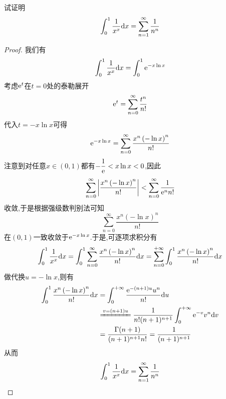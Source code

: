 \documentclass{ctexart}
\begin{document}
\begin{problem}[9.(5\songti{分})]
    试证明
    \[\int_0^1\dfrac{1}{x^x}\mathrm{d} x=\sum_{n=1}^{\infty}\dfrac{1}{n^n}\]
    
\end{problem}
\begin{proof}
    我们有
    \[\int_0^1\dfrac{1}{x^x}\mathrm{d} x=\int_0^1\mathrm{e}^{-x\ln x}\]
    考虑$\mathrm{e}^t$在$t=0$处的泰勒展开
    \[\mathrm{e}^t=\sum_{n=0}^{\infty}\dfrac{t^n}{n!}\]
    代入$t=-x\ln x$可得
    \[\mathrm{e}^{-x\ln x}=\sum_{n=0}^{\infty}\dfrac{x^n\left(-\ln x\right)^n}{n!}\]
    注意到对任意$x\in(0,1)$都有$-\dfrac1{\mathrm{e}}<x\ln x<0$,因此
    \[\sum_{n=0}^{\infty}\left|\dfrac{x^n\left(-\ln x\right)^n}{n!}\right|<\sum_{n=0}^{\infty}\dfrac{1}{\mathrm{e}^nn!}\]
    收敛,于是根据强级数判别法可知
    \[\sum_{n=0}^{\infty}\dfrac{x^n\left(-\ln x\right)^n}{n!}\]
    在$(0,1)$一致收敛于$\mathrm{e}^{-x\ln x}$.于是,可逐项求积分有
    \[\int_0^1\dfrac{1}{x^x}\mathrm{d} x=\int_0^1\sum_{n=0}^{\infty}\dfrac{x^n\left(-\ln x\right)^n}{n!}\mathrm{d} x
    =\sum_{n=0}^{+\infty}\int_0^1\dfrac{x^n\left(-\ln x\right)^n}{n!}\mathrm{d} x\]
    做代换$u=-\ln x$,则有
    \[\begin{aligned}
        \int_0^1\dfrac{x^n\left(-\ln x\right)^n}{n!}\di x
        &=\int_0^{+\infty}\dfrac{\e^{-(n+1)u}u^n}{n!}\di u \\
        &\xlongequal{v=(n+1)u}\dfrac{1}{n!(n+1)^{n+1}}\int_0^{+\infty}\e^{-v}v^n\di v \\
        &=\dfrac{\Gamma(n+1)}{(n+1)^{n+1}n!}=\dfrac{1}{(n+1)^{n+1}}
    \end{aligned}\]
    从而
    \[\int_0^1\dfrac{1}{x^x}\mathrm{d} x=\sum_{n=1}^{\infty}\dfrac{1}{n^n}\]
\end{proof}
\end{document}

